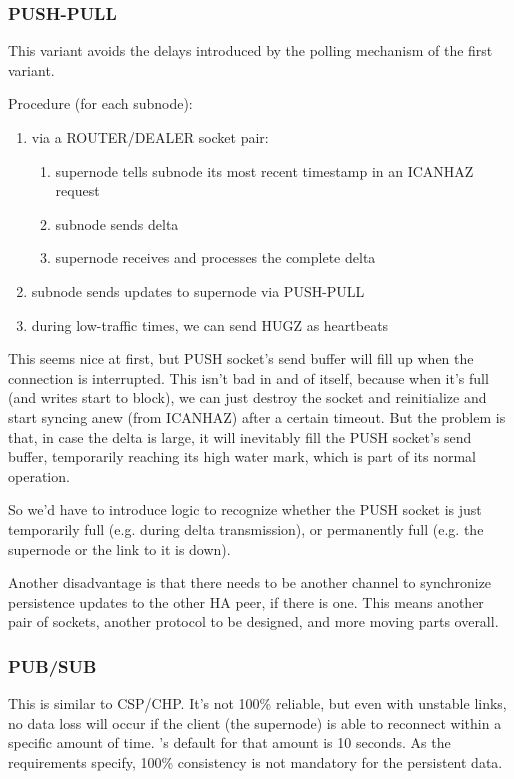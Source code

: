 \subsubsection{PUSH-PULL}
This variant avoids the delays introduced by the polling mechanism of the first variant.

Procedure (for each subnode):
\begin{enumerate}
	\item via a ROUTER/DEALER socket pair:
		\begin{enumerate}
			\item supernode tells subnode its most recent timestamp in an ICANHAZ request
			\item subnode sends delta
			\item supernode receives and processes the complete delta
		\end{enumerate}
	\item subnode sends updates to supernode via PUSH-PULL
	\item during low-traffic times, we can send HUGZ as heartbeats
\end{enumerate}

This seems nice at first, but PUSH socket's send buffer will fill up when the
connection is interrupted.  This isn't bad in and of itself, because when it's
full (and writes start to block), we can just destroy the socket and
reinitialize and start syncing anew (from ICANHAZ) after a certain timeout.
But the problem is that, in case the delta is large, it will inevitably fill
the PUSH socket's send buffer, temporarily reaching its high water mark, which
is part of its normal operation.

So we'd have to introduce logic to recognize whether the PUSH
socket is just temporarily full (e.g. during delta transmission), or
permanently full (e.g. the supernode or the link to it is down).

Another disadvantage is that there needs to be another channel to synchronize
persistence updates to the other HA peer, if there is one. This means another
pair of sockets, another protocol to be designed, and more moving parts
overall.

\subsubsection{PUB/SUB}
This is similar to \gls{CSP}/\gls{CHP}. It's not 100\% reliable, but even with unstable
links, no data loss will occur if the client (the supernode) is able to reconnect within a
specific amount of time. \zmq's default for that amount is 10 seconds. As the
requirements specify, 100\% consistency is not mandatory for the persistent
data.

